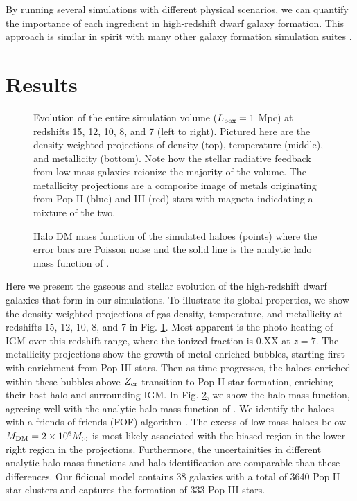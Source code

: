 \documentclass[useAMS,usenatbib]{mn2e}
\begin{document}
By running several simulations with different physical scenarios, we
can quantify the importance of each ingredient in high-redshift dwarf
galaxy formation.  This approach is similar in spirit with many other
galaxy formation simulation suites \citep[e.g.][]{Schaye10,
  Maio10_Pop32}.

\section{Results}
\label{sec:results}

\begin{figure*}
  \caption{\label{fig:evo-mosaic} Evolution of the entire simulation
    volume ($L_{\rm box} = 1$ Mpc) at redshifts 15, 12, 10, 8, and 7
    (left to right).  Pictured here are the density-weighted
    projections of density (top), temperature (middle), and
    metallicity (bottom).  Note how the stellar radiative feedback
    from low-mass galaxies reionize the majority of the volume.  The
    metallicity projections are a composite image of metals
    originating from Pop II (blue) and III (red) stars with magneta
    indicdating a mixture of the two.}
\end{figure*}

\begin{figure}
  \caption{\label{fig:mass_fn} Halo DM mass function of the simulated
    haloes (points) where the error bars are Poisson noise and the
    solid line is the analytic halo mass function of
    \citet{Warren06}.}
\end{figure}



Here we present the gaseous and stellar evolution of the high-redshift
dwarf galaxies that form in our simulations.  To illustrate its global
properties, we show the density-weighted projections of gas density,
temperature, and metallicity at redshifts 15, 12, 10, 8, and 7 in
Fig. \ref{fig:evo-mosaic}.  Most apparent is the photo-heating of IGM
over this redshift range, where the ionized fraction is 0.XX at $z=7$.
The metallicity projections show the growth of metal-enriched bubbles,
starting first with enrichment from Pop III stars.  Then as time
progresses, the haloes enriched within these bubbles above $Z_{\rm
  cr}$ transition to Pop II star formation, enriching their host halo
and surrounding IGM.  In Fig. \ref{fig:mass_fn}, we show the halo mass
function, agreeing well with the analytic halo mass function of
\citet{Warren06}.  We identify the haloes with a friends-of-friends
(FOF) algorithm \citep{Davis85}.  The excess of low-mass haloes below
$M_{\rm DM} = 2 \times 10^6 \Ms$ is most likely associated with the
biased region in the lower-right region in the projections.
Furthermore, the uncertainities in different analytic halo mass
functions \citep[see][for a comparison]{Reed07} and halo
identification are comparable than these differences.  Our fidicual
model contains 38 galaxies with a total of 3640 Pop II star clusters
and captures the formation of 333 Pop III stars.
\end{document}
